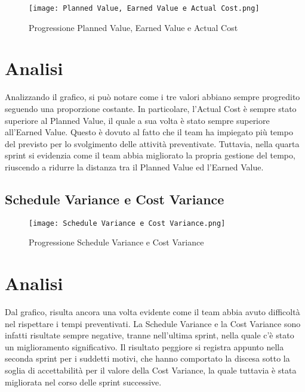 \begin{figure}[h] 
    \centering
    \texttt{[image: Planned Value, Earned Value e Actual Cost.png]}
    \caption{Progressione Planned Value, Earned Value e Actual Cost} 
    \label{fig: Planned Value, Earned Value e Actual Cost}
\end{figure}

\section*{Analisi}

Analizzando il grafico, si può notare come i tre valori abbiano sempre progredito seguendo una
proporzione costante. In particolare, l’Actual Cost è sempre stato superiore al Planned Value,
il quale a sua volta è stato sempre superiore all’Earned Value. Questo è dovuto al fatto che
il team ha impiegato più tempo del previsto per lo svolgimento delle attività preventivate. 
Tuttavia, nella quarta sprint si evidenzia come il team
abbia migliorato la propria gestione del tempo, riuscendo a ridurre la distanza tra il Planned Value
ed l'Earned Value.

\newpage

\subsection{Schedule Variance e Cost Variance}
\label{subsec:Schedule Variance e Cost Variance}

\begin{figure}[h] 
    \centering
    \texttt{[image: Schedule Variance e Cost Variance.png]}
    \caption{Progressione Schedule Variance e Cost Variance} 
    \label{fig: Schedule Variance e Cost Variance}
\end{figure}

\section*{Analisi}

Dal grafico, risulta ancora una volta evidente come il team abbia avuto difficoltà nel
rispettare i tempi preventivati. La Schedule Variance e la Cost Variance sono infatti
risultate sempre negative, tranne nell'ultima sprint, nella quale c'è stato un miglioramento
significativo. Il risultato peggiore si registra appunto nella seconda sprint per i suddetti
motivi, che hanno comportato la discesa sotto la soglia di accettabilità per il valore della
Cost Variance, la quale tuttavia è stata migliorata nel corso delle sprint successive.

